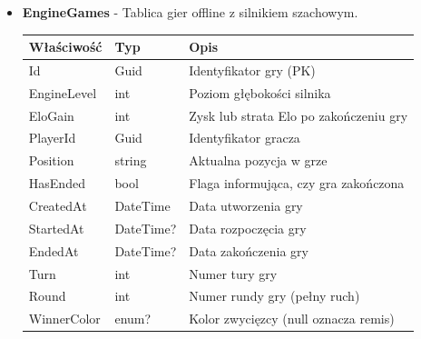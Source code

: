\documentclass[12pt,a4paper]{article}
\begin{document}
\begin{itemize}
    \item \textbf{EngineGames} - Tablica gier offline z silnikiem szachowym. 
    \begin{longtable}{|m{4cm}|m{2cm}|m{8cm}|}
        \hline
        \textbf{Właściwość} & \textbf{Typ} & \textbf{Opis} \\ \hline
        \endhead
        \hline
        Id & Guid & Identyfikator gry (PK) \\ \hline
        EngineLevel & int & Poziom głębokości silnika \\ \hline
        EloGain & int & Zysk lub strata Elo po zakończeniu gry \\ \hline
        PlayerId & Guid & Identyfikator gracza \\ \hline
        Position & string & Aktualna pozycja w grze \\ \hline
        HasEnded & bool & Flaga informująca, czy gra zakończona \\ \hline
        CreatedAt & DateTime & Data utworzenia gry \\ \hline
        StartedAt & DateTime? & Data rozpoczęcia gry \\ \hline
        EndedAt & DateTime? & Data zakończenia gry \\ \hline
        Turn & int & Numer tury gry \\ \hline
        Round & int & Numer rundy gry (pełny ruch) \\ \hline
        WinnerColor & enum? & Kolor zwycięzcy (null oznacza remis) \\ \hline
    \end{longtable}


\end{itemize}
\end{document}
